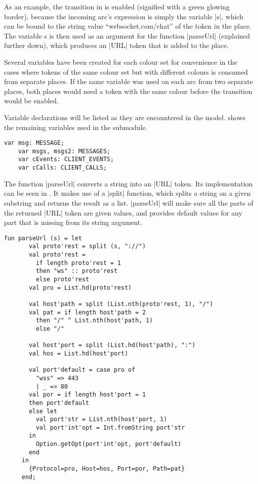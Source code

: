 	As an example, the  transition in  is
	enabled (signified with a green glowing border), because the incoming arc's
	expression is simply the variable |s|, which can be bound to the string value
	``websocket.com/chat'' of the token in the  place. The variable
	s is then used as an argument for the function |parseUrl| (explained further
	down), which produces an |URL| token that is added to the  place.
	
	Several variables have been created for each colour set for convenience in
	the cases where tokens of the same colour set but with different colours is
	consumed from separate places. If the same variable was used on each arc from
	two separate places, both places would need a token with the same colour
	before the transition would be enabled. 
	
	Variable declarations will be listed as they are encountered in the
	model.  shows the remaining variables used in the
	 submodule.
	
	\begin{lstlisting}[label=lst:client_app_vars,caption=Client Application
	Variables,gobble=1]
	var msg: MESSAGE;
	var msgs, msgs2: MESSAGES;
	var cEvents: CLIENT_EVENTS;
	var cCalls: CLIENT_CALLS;
	\end{lstlisting}
	
	The function |parseUrl| converts a string into an |URL| token. Its
	implementation can be seen in . It makes use of a
	|split| function, which splits a string on a given substring and returns the
	result as a list. |parseUrl| will make sure all the parts of the returned |URL|
	token are given values, and provides default values for any part that is
	missing from its string argument. 
	
	\begin{lstlisting}[label=lst:client_app_parseUrl,caption=The parseUrl function,gobble=1,float] 
	 fun parseUrl (s) = let
	   val proto'rest = split (s, "://")
	   val proto'rest = 
	     if length proto'rest = 1 
	     then "ws" :: proto'rest 
	     else proto'rest 
	   val pro = List.hd(proto'rest)
	 
	   val host'path = split (List.nth(proto'rest, 1), "/")
	   val pat = if length host'path = 2
	     then "/" ^ List.nth(host'path, 1)
	     else "/"
	   
	   val host'port = split (List.hd(host'path), ":")
	   val hos = List.hd(host'port)
	 
	   val port'default = case pro of
	     "wss" => 443
	     | _ => 80
	   val por = if length host'port = 1 
	   then port'default
	   else let
	     val port'str = List.nth(host'port, 1)
	     val port'int'opt = Int.fromString port'str
	   in
	     Option.getOpt(port'int'opt, port'default)
	   end
	 in
	   {Protocol=pro, Host=hos, Port=por, Path=pat}
	 end;
	\end{lstlisting}
	
